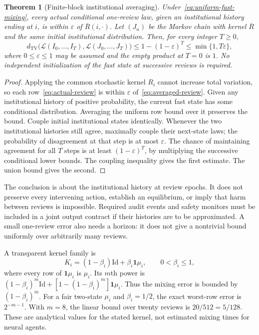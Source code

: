 \documentclass[11pt,letterpaper]{article}
\theoremstyle{plain}
\newtheorem{theorem}[proposition]{Theorem}
\theoremstyle{definition}
\theoremstyle{remark}
\newcommand{\TV}{d_{\mathrm{TV}}}
\newcommand{\Law}{\mathcal L}
\begin{document}
\begin{theorem}[Finite-block institutional averaging]\label{thm:block-averaging}
Under~\eqref{eq:uniform-fast-mixing}, every actual conditional one-review law, given an institutional history ending at $i$, is within $\varepsilon$ of $\overline R(i,\cdot)$. Let $(J_n)$ be the Markov chain with kernel $\overline R$ and the same initial institutional distribution. Then, for every integer $T\geq0$,
\begin{equation}\label{eq:institutional-path-error}
\TV\bigl(\Law(I_0,\ldots,I_T),\Law(J_0,\ldots,J_T)\bigr)
\leq 1-(1-\varepsilon)^T\leq\min\{1,T\varepsilon\},
\end{equation}
where $0\leq\varepsilon\leq1$ may be assumed and the empty product at $T=0$ is $1$. No independent initialization of the fast state at successive reviews is required.
\end{theorem}
\begin{proof}
Applying the common stochastic kernel $R_i$ cannot increase total variation, so each row~\eqref{eq:actual-review} is within $\varepsilon$ of~\eqref{eq:averaged-review}. Given any institutional history of positive probability, the current fast state has some conditional distribution. Averaging the uniform row bound over it preserves the bound. Couple initial institutional states identically. Whenever the two institutional histories still agree, maximally couple their next-state laws; the probability of disagreement at that step is at most $\varepsilon$. The chance of maintaining agreement for all $T$ steps is at least $(1-\varepsilon)^T$, by multiplying the successive conditional lower bounds. The coupling inequality gives the first estimate. The union bound gives the second.
\end{proof}

The conclusion is about the institutional history at review epochs. It does not preserve every intervening action, establish an equilibrium, or imply that harm between reviews is impossible. Required audit events and safety monitors must be included in a joint output contract if their histories are to be approximated. A small one-review error also needs a horizon: it does not give a nontrivial bound uniformly over arbitrarily many reviews.

A transparent kernel family is
\[
K_i=(1-\beta_i)\mathrm{Id}+\beta_i\mathbf 1\mu_i,
\qquad 0<\beta_i\leq1,
\]
where every row of $\mathbf 1\mu_i$ is $\mu_i$. Its $m$th power is $(1-\beta_i)^m\mathrm{Id}+[1-(1-\beta_i)^m]\mathbf 1\mu_i$. Thus the mixing error is bounded by $(1-\beta_i)^m$. For a fair two-state $\mu_i$ and $\beta_i=1/2$, the exact worst-row error is $2^{-m-1}$. With $m=8$, the linear bound over twenty reviews is $20/512=5/128$. These are analytical values for the stated kernel, not estimated mixing times for neural agents.
\end{document}
